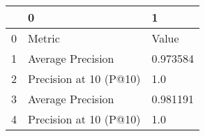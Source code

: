 \begin{tabular}{lll}
\toprule
{} &                       0 &         1 \\
\midrule
0 &                  Metric &     Value \\
1 &       Average Precision &  0.973584 \\
2 &  Precision at 10 (P@10) &       1.0 \\
3 &       Average Precision &  0.981191 \\
4 &  Precision at 10 (P@10) &       1.0 \\
\bottomrule
\end{tabular}
